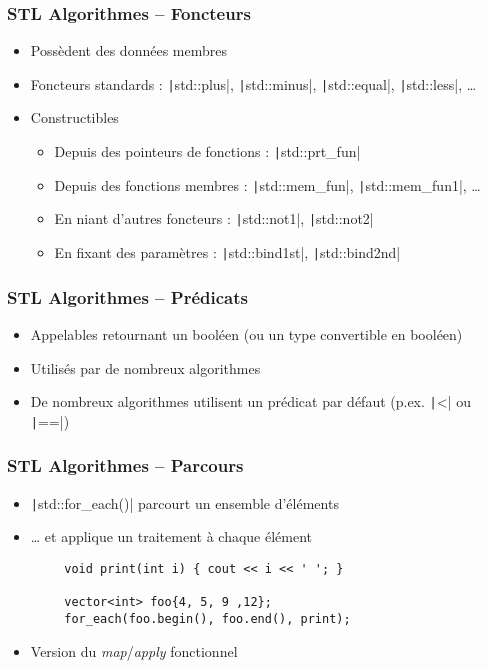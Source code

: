 \documentclass[C++.tex]{subfiles}
\begin{document}
\begin{frame}[fragile]
	\frametitle{STL Algorithmes -- Foncteurs}
	\begin{itemize}
		\item Possèdent des données membres
		\item Foncteurs standards : \texttt|std::plus|, \texttt|std::minus|, \texttt|std::equal|, \texttt|std::less|, \ldots{}
		\item Constructibles
		\begin{itemize}
			\item Depuis des pointeurs de fonctions : \texttt|std::prt_fun|
			\item Depuis des fonctions membres : \texttt|std::mem_fun|, \texttt|std::mem_fun1|, \ldots{}
			\item En niant d'autres foncteurs : \texttt|std::not1|, \texttt|std::not2|
			\item En fixant des paramètres : \texttt|std::bind1st|, \texttt|std::bind2nd|
		\end{itemize}
	\end{itemize}
\end{frame}

\begin{frame}[fragile]
	\frametitle{STL Algorithmes -- Prédicats}
	\begin{itemize}
		\item Appelables retournant un booléen (ou un type convertible en booléen)
		\item Utilisés par de nombreux algorithmes
		\item De nombreux algorithmes utilisent un prédicat par défaut (p.ex. \texttt|<| ou \texttt|==|)
	\end{itemize}
\end{frame}

\begin{frame}[fragile]
	\frametitle{STL Algorithmes -- Parcours}
	\begin{itemize}
		\item \texttt|std::for_each()| parcourt un ensemble d'éléments
		\item \ldots{} et applique un traitement à chaque élément
	\end{itemize}

	\begin{verbatim}
		void print(int i) { cout << i << ' '; }

		vector<int> foo{4, 5, 9 ,12};
		for_each(foo.begin(), foo.end(), print);
	\end{verbatim}

	\begin{itemize}
		\item Version du \textit{map}/\textit{apply} fonctionnel
	\end{itemize}
\end{frame}
\end{document}
